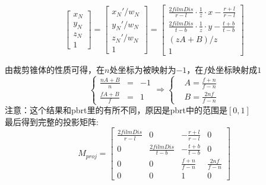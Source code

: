 \begin{displaymath}
\begin{bmatrix}
x_N\\
y_N\\
z_N\\
1
\end{bmatrix} = 
\begin{bmatrix}
x_N'/w_N\\
y_N'/w_N\\
z_N'/w_N\\
1
\end{bmatrix} = 
\begin{bmatrix}
\frac{2filmDis}{r - l}\cdot\frac{1}{z}\cdot x - \frac{r + l}{r - l}\\
\frac{2filmDis}{t - b}\cdot\frac{1}{z}\cdot y - \frac{t + b}{t - b}\\
(zA + B) / z \\
1
\end{bmatrix}
\end{displaymath}

由裁剪锥体的性质可得，在$n$处坐标为被映射为$-1$，在$f$处坐标映射成$1$
\begin{displaymath}
\left\{
\begin{aligned}{}
\frac{nA + B}{n} & = & -1\\
\frac{fA + B}{f} & = & 1
\end{aligned}
\right.
\Longrightarrow
\left\{
\begin{aligned}
&A = \frac{f + n}{f - n}\\
&B = \frac{2nf}{f - n}
\end{aligned}
\right.
\end{displaymath}
注意：这个结果和pbrt里的有所不同，原因是pbrt中的范围是$[0,1]$
\\

最后得到完整的投影矩阵:
\begin{displaymath}
M_{proj} = 
\begin{bmatrix}
\frac{2filmDis}{r - l} & 0 & -\frac{r + l}{r - l} & 0\\
0 & \frac{2filmDis}{t - b} & -\frac{t + b}{t - b} & 0\\
0 & 0 & \frac{f + n}{f - n} & \frac{2nf}{f - n}\\
0 & 0 & 1 & 0
\end{bmatrix}
\end{displaymath}
\\

